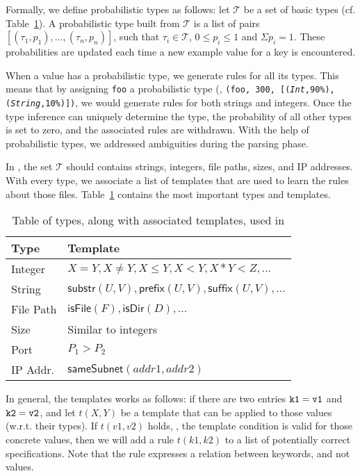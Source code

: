 Formally, we define probabilistic types as follows: let $\mathcal{T}$ be a set of basic types (cf. Table~\ref{table:kysymys}).
A probabilistic type built from $\mathcal{T}$ is a list of pairs 
$[(\tau_1, p_1),\ldots,(\tau_n, p_n)]$,
such that $\tau_i \in \mathcal{T}$, $0 \le p_i \le 1$ 
and $\Sigma p_i = 1$. 
These probabilities are updated each time a new example value 
for a key is encountered.

When a value has a probabilistic type, we generate rules for all its types.
This means that by assigning {\texttt{foo}} a probabilistic type 
(\eg, {\tt (\texttt{foo}, 300, [(\textsl{Int},90\%), 
(\textsl{String},10\%)])},
we would generate rules for both strings and integers.
Once the type inference can uniquely determine the type, 
the probability of all other types is set to zero, 
and the associated rules are withdrawn. With the help of probabilistic types, we addressed ambiguities during the parsing phase. 

In \app, the set $\mathcal{T}$ should contains strings, integers, file paths, 
sizes, and IP addresses. With every type, we associate a list of templates 
that are used to learn the rules about those files. Table~\ref{table:kysymys} contains
the most important types and templates.

\begin{table}
\caption{Table of types, along with associated templates, used in \app}
  \begin{tabular}{| l |  l |}
    \hline
    Type &  Template \\ \hline
    \hline
    Integer & $X = Y, X\neq Y, X \leq Y, X < Y, X * Y < Z, \ldots $\\ \hline
    String & $\textsf{substr}(U, V), \textsf{prefix}(U,V), \textsf{suffix}(U,V), \ldots$   \\ \hline
    File Path & $\textsf{isFile}(F), \textsf{isDir}(D),\ldots$   \\ \hline
    Size & Similar to integers   \\ \hline
    Port & $P_1 > P_2$ \\ \hline
    IP Addr.  & $\textsf{sameSubnet}(addr1, addr2)$   \\
    
    \hline
  \end{tabular}
\label{table:kysymys}
\end{table}

In general, the templates works as follows: if there are two entries ${\tt {k1 = v1}}$ and 
${\tt {k2 = v2}}$, and let $t(X, Y)$ be a template that can be applied to those values (w.r.t. their types).
If $t(v1, v2)$ holds, \ie, the template condition is valid for those concrete values, then we will add a rule
$t(k1, k2)$ to a list of potentially correct specifications. Note that the rule expresses a relation between keywords, and not values.

